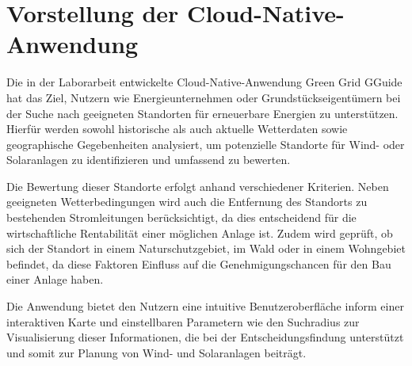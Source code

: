 
\chapter{Vorstellung der Cloud-Native-Anwendung}
Die in der Laborarbeit entwickelte Cloud-Native-Anwendung Green Grid GGuide hat das Ziel, Nutzern wie Energieunternehmen oder Grundstückseigentümern bei der Suche nach geeigneten Standorten für erneuerbare Energien zu unterstützen. Hierfür werden sowohl historische als auch aktuelle Wetterdaten sowie geographische Gegebenheiten analysiert, um potenzielle Standorte für Wind- oder Solaranlagen zu identifizieren und umfassend zu bewerten.

Die Bewertung dieser Standorte erfolgt anhand verschiedener Kriterien. Neben geeigneten Wetterbedingungen wird auch die Entfernung des Standorts zu bestehenden Stromleitungen berücksichtigt, da dies entscheidend für die wirtschaftliche Rentabilität einer möglichen Anlage ist. Zudem wird geprüft, ob sich der Standort in einem Naturschutzgebiet, im Wald oder in einem Wohngebiet befindet, da diese Faktoren Einfluss auf die Genehmigungschancen für den Bau einer Anlage haben.

Die Anwendung bietet den Nutzern eine intuitive Benutzeroberfläche inform einer interaktiven Karte und einstellbaren Parametern wie den Suchradius zur Visualisierung dieser Informationen, die bei der Entscheidungsfindung unterstützt und somit zur Planung von Wind- und Solaranlagen beiträgt.